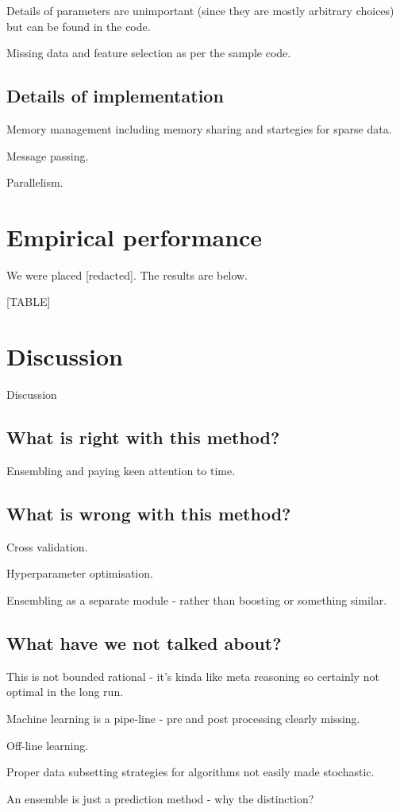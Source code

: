 \documentclass{article} %
\begin{document}
Details of parameters are unimportant (since they are mostly arbitrary choices) but can be found in the code.

Missing data and feature selection as per the sample code.

\subsection{Details of implementation}

Memory management including memory sharing and startegies for sparse data.

Message passing.

Parallelism.

\section{Empirical performance}

We were placed [redacted].
The results are below.

[TABLE]

\section{Discussion}

Discussion

\subsection{What is right with this method?}

Ensembling and paying keen attention to time.

\subsection{What is wrong with this method?}

Cross validation.

Hyperparameter optimisation.

Ensembling as a separate module - rather than boosting or something similar.

\subsection{What have we not talked about?}

This is not bounded rational - it's kinda like meta reasoning so certainly not optimal in the long run.

Machine learning is a pipe-line - pre and post processing clearly missing.

Off-line learning.

Proper data subsetting strategies for algorithms not easily made stochastic.

An ensemble is just a prediction method - why the distinction?


\small



\end{document}

